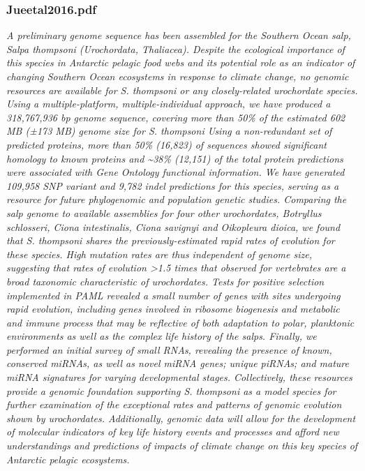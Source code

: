 \documentclass[graybox]{svmult}
\begin{document}
\subsubsection{Jueetal2016.pdf}
\cite{Jue2016}
\textit{A preliminary genome sequence has been assembled for the Southern Ocean salp, Salpa thompsoni (Urochordata, Thaliacea). Despite the ecological importance of this species in Antarctic pelagic food webs and its potential role as an indicator of changing Southern Ocean ecosystems in response to climate change, no genomic resources are available for S. thompsoni or any closely-related urochordate species. Using a multiple-platform, multiple-individual approach, we have produced a 318,767,936 bp genome sequence, covering more than 50{\%} of the estimated 602 MB (±173 MB) genome size for S. thompsoni Using a non-redundant set of predicted proteins, more than 50{\%} (16,823) of sequences showed significant homology to known proteins and {\~{}}38{\%} (12,151) of the total protein predictions were associated with Gene Ontology functional information. We have generated 109,958 SNP variant and 9,782 indel predictions for this species, serving as a resource for future phylogenomic and population genetic studies. Comparing the salp genome to available assemblies for four other urochordates, Botryllus schlosseri, Ciona intestinalis, Ciona savignyi and Oikopleura dioica, we found that S. thompsoni shares the previously-estimated rapid rates of evolution for these species. High mutation rates are thus independent of genome size, suggesting that rates of evolution {\textgreater}1.5 times that observed for vertebrates are a broad taxonomic characteristic of urochordates. Tests for positive selection implemented in PAML revealed a small number of genes with sites undergoing rapid evolution, including genes involved in ribosome biogenesis and metabolic and immune process that may be reflective of both adaptation to polar, planktonic environments as well as the complex life history of the salps. Finally, we performed an initial survey of small RNAs, revealing the presence of known, conserved miRNAs, as well as novel miRNA genes; unique piRNAs; and mature miRNA signatures for varying developmental stages. Collectively, these resources provide a genomic foundation supporting S. thompsoni as a model species for further examination of the exceptional rates and patterns of genomic evolution shown by urochordates. Additionally, genomic data will allow for the development of molecular indicators of key life history events and processes and afford new understandings and predictions of impacts of climate change on this key species of Antarctic pelagic ecosystems.}
\end{document}
